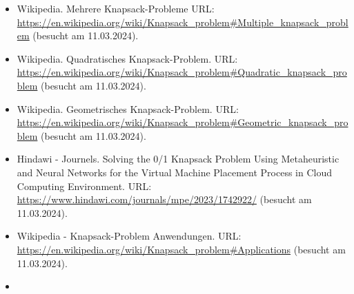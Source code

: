 \begin{itemize}
    \item Wikipedia. Mehrere Knapsack-Probleme URL: \url{https://en.wikipedia.org/wiki/Knapsack_problem#Multiple_knapsack_problem} (besucht am 11.03.2024).
    \item Wikipedia. Quadratisches Knapsack-Problem. URL: \url{https://en.wikipedia.org/wiki/Knapsack_problem#Quadratic_knapsack_problem} (besucht am 11.03.2024).
    \item Wikipedia. Geometrisches Knapsack-Problem. URL: \url{https://en.wikipedia.org/wiki/Knapsack_problem#Geometric_knapsack_problem} (besucht am 11.03.2024).
    \item Hindawi - Journels. Solving the 0/1 Knapsack Problem Using Metaheuristic and Neural Networks for the Virtual Machine Placement Process in Cloud Computing Environment. URL: \url{https://www.hindawi.com/journals/mpe/2023/1742922/} (besucht am 11.03.2024).
    \item Wikipedia - Knapsack-Problem Anwendungen. URL: \url{https://en.wikipedia.org/wiki/Knapsack_problem#Applications} (besucht am 11.03.2024).
    \item
\end{itemize}





